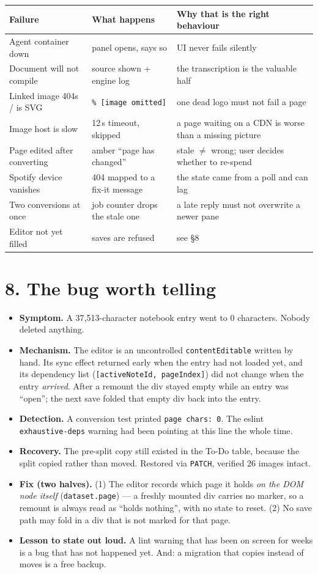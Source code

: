 \documentclass[10pt]{article}
\newcommand{\code}[1]{\texttt{\small #1}}
\begin{document}
\begin{tabular}{@{}p{4.6cm}p{5.2cm}p{7.2cm}@{}}
\toprule
\textbf{Failure} & \textbf{What happens} & \textbf{Why that is the right behaviour} \\
\midrule
Agent container down & panel opens, says so & UI never fails silently \\
Document will not compile & source shown + engine log & the transcription is the valuable half \\
Linked image 404s / is SVG & \code{\% [image omitted]} & one dead logo must not fail a page \\
Image host is slow & 12\,s timeout, skipped & a page waiting on a CDN is worse than a missing picture \\
Page edited after converting & amber ``page has changed'' & stale $\ne$ wrong; user decides whether to re-spend \\
Spotify device vanishes & 404 mapped to a fix-it message & the state came from a poll and can lag \\
Two conversions at once & job counter drops the stale one & a late reply must not overwrite a newer pane \\
Editor not yet filled & saves are refused & see \S8 \\
\bottomrule
\end{tabular}

\section*{8. The bug worth telling}

\begin{itemize}
\item \textbf{Symptom.} A 37{,}513-character notebook entry went to 0 characters. Nobody deleted anything.
\item \textbf{Mechanism.} The editor is an uncontrolled \code{contentEditable} written by hand. Its sync effect returned early when the entry had not loaded yet, and its dependency list (\code{[activeNoteId, pageIndex]}) did not change when the entry \emph{arrived}. After a remount the div stayed empty while an entry was ``open''; the next save folded that empty div back into the entry.
\item \textbf{Detection.} A conversion test printed \code{page chars: 0}. The eslint \code{exhaustive-deps} warning had been pointing at this line the whole time.
\item \textbf{Recovery.} The pre-split copy still existed in the To-Do table, because the split copied rather than moved. Restored via \code{PATCH}, verified 26 images intact.
\item \textbf{Fix (two halves).} (1) The editor records which page it holds \emph{on the DOM node itself} (\code{dataset.page}) --- a freshly mounted div carries no marker, so a remount is always read as ``holds nothing'', with no state to reset. (2) No save path may fold in a div that is not marked for that page.
\item \textbf{Lesson to state out loud.} A lint warning that has been on screen for weeks is a bug that has not happened yet. And: a migration that copies instead of moves is a free backup.
\end{itemize}
\end{document}

